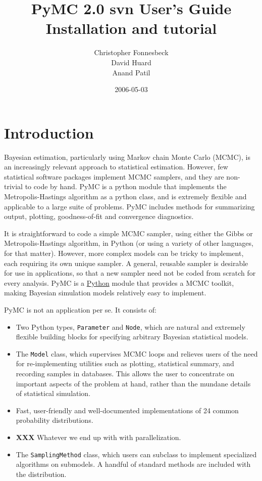 \documentclass[]{book}
\title{PyMC 2.0 svn User's Guide \\
Installation and tutorial}
\author{ Christopher Fonnesbeck\\ David Huard \\ Anand Patil }
\date{2006-05-03}
\begin{document}
\ifpdf
{}
\else
{}
\fi

\maketitle

\tableofcontents

\chapter{Introduction} %

Bayesian estimation, particularly using Markov chain Monte Carlo (MCMC), is an increasingly relevant approach to statistical estimation. However, few statistical software packages implement MCMC samplers, and they are non-trivial to code by hand. PyMC is a python module that implements the Metropolis-Hastings algorithm as a python class, and is extremely flexible and applicable to a large suite of problems. PyMC includes methods for summarizing output, plotting, goodness-of-fit and convergence diagnostics.

It is straightforward to code a simple MCMC sampler, using either the Gibbs or Metropolis-Hastings algorithm, in Python (or using a variety of other languages, for that matter). However, more complex models can be tricky to implement, each requiring its own unique sampler. A general, reusable sampler is desirable for use in applications, so that a new sampler need not be coded from scratch for every analysis. PyMC is a \href{http://python.org}{Python} module that provides a MCMC toolkit, making Bayesian simulation models relatively easy to implement.

\bigskip
PyMC is not an application per se. It consists of:
\begin{itemize}
    \item Two Python types, \texttt{Parameter} and \texttt{Node}, which are natural and extremely flexible building blocks for specifying arbitrary Bayesian statistical models.
    \item The \texttt{Model} class, which supervises MCMC loops and relieves users of the need for re-implementing utilities such as plotting, statistical summary, and recording samples in databases. This allows the user to concentrate on important aspects of the problem at hand, rather than the mundane details of statistical simulation.
    \item Fast, user-friendly and well-documented implementations of 24 common probability distributions.
    \item \textbf{XXX} Whatever we end up with with parallelization.
    \item The \texttt{SamplingMethod} class, which users can subclass to implement specialized algorithms on submodels. A handful of standard methods are included with the distribution.
\end{itemize}
\end{document}
